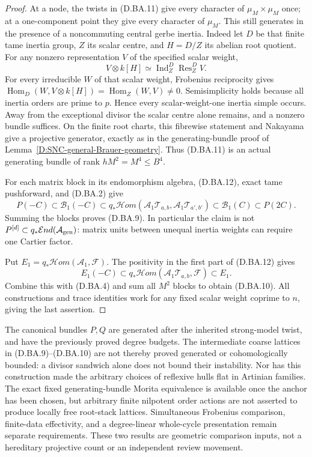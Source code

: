 \begin{proof}
At a node, the twists in (D.BA.11) give every character of
$\mu_M\times\mu_M$ once; at a one-component point they give
every character of $\mu_M$. This still generates in the
presence of a noncommuting central gerbe inertia. Indeed let
$D$ be that finite tame inertia group, $Z$ its scalar centre,
and $H=D/Z$ its abelian root quotient. For any nonzero
representation $V$ of the specified scalar weight,
\[
 V\otimes k[H]\simeq
       \operatorname{Ind}_Z^D\operatorname{Res}_Z^D V.
                                                        \tag{D.BA.13}
\]
For every irreducible $W$ of that scalar weight, Frobenius
reciprocity gives
$\operatorname{Hom}_D(W,V\otimes k[H])
 =\operatorname{Hom}_Z(W,V)\ne0$.
Semisimplicity holds because all inertia orders are prime to
$p$. Hence every scalar-weight-one inertia simple occurs.
Away from the exceptional divisor the scalar centre alone
remains, and a nonzero bundle suffices. On the finite root
charts, this fibrewise statement and Nakayama give a projective
generator, exactly as in the generating-bundle proof of
Lemma~\ref{D:SNC-general-Brauer-geometry}.
Thus (D.BA.11) is an actual generating bundle of rank
$hM^2=M^4\le B^4$.

For each matrix block in its endomorphism algebra,
(D.BA.12), exact tame pushforward, and (D.BA.2) give
\[
 P(-C)\subset\mathcal B_1(-C)
 \subset q_*\mathcal Hom(
       \mathcal A_1\mathcal T_{a,b},
       \mathcal A_1\mathcal T_{a',b'})
 \subset\mathcal B_1(C)\subset P(2C).
                                                        \tag{D.BA.14}
\]
Summing the blocks proves (D.BA.9). In particular the claim
is not $P^{[d]}\subset q_*\mathcal End(\mathcal A_{\rm gen})$:
matrix units between unequal inertia weights can require
one Cartier factor.

Put $E_1=q_*\mathcal Hom(\mathcal A_1,\mathcal F)$.
The positivity in the first part of (D.BA.12) gives
\[
 E_1(-C)\subset
 q_*\mathcal Hom(\mathcal A_1\mathcal T_{a,b},\mathcal F)
                  \subset E_1.                        \tag{D.BA.15}
\]
Combine this with (D.BA.4) and sum all $M^2$ blocks to
obtain (D.BA.10). All constructions and trace identities
work for any fixed scalar weight coprime to $n$, giving
the last assertion.
\end{proof}

\begin{remark}
The canonical bundles $P,Q$ are generated after the inherited
strong-model twist, and have the previously proved degree
budgets. The intermediate coarse lattices in (D.BA.9)--(D.BA.10)
are not thereby proved generated or cohomologically bounded:
a divisor sandwich alone does not bound their instability.
Nor has this construction made the arbitrary choices of
reflexive hulls flat in Artinian families. The exact fixed
generating-bundle Morita equivalence is available once the
anchor has been chosen, but arbitrary finite nilpotent order
actions are not asserted to produce locally free root-stack
lattices. Simultaneous Frobenius comparison, finite-data
effectivity, and a degree-linear whole-cycle presentation
remain separate requirements. These two results are geometric
comparison inputs, not a hereditary projective count or an
independent review movement.
\end{remark}
